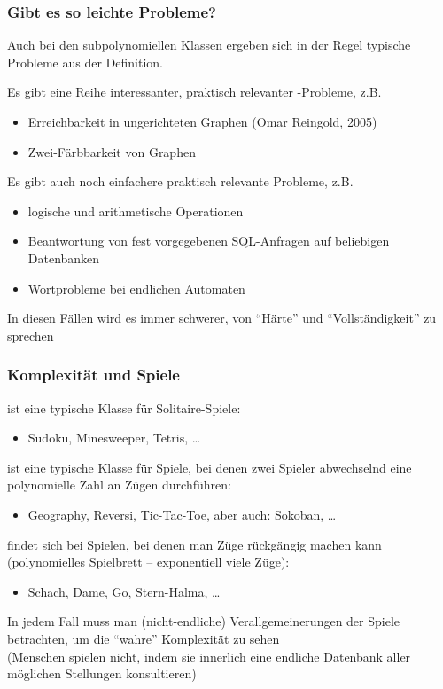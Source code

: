 \documentclass[aspectratio=1610,onlymath]{beamer}
\begin{document}
\begin{frame}\frametitle{Gibt es so leichte Probleme?}

Auch bei den subpolynomiellen Klassen ergeben sich in der Regel typische Probleme
aus der Definition.
\bigskip\pause

Es gibt eine Reihe \alert{interessanter, praktisch relevanter \LogSpace-Probleme}, z.B.
\begin{itemize}
\item Erreichbarkeit in ungerichteten Graphen (Omar Reingold, 2005)
\item Zwei-Färbbarkeit von Graphen
\end{itemize}
\bigskip\pause

Es gibt auch \alert{noch einfachere praktisch relevante Probleme}, z.B.
\begin{itemize}
\item logische und arithmetische Operationen
\item Beantwortung von fest vorgegebenen SQL-Anfragen auf beliebigen Datenbanken
\item Wortprobleme bei endlichen Automaten
\end{itemize}

In diesen Fällen wird es immer schwerer, von "`Härte"' und "`Vollständigkeit"' zu sprechen

\end{frame}

\begin{frame}\frametitle{Komplexität und Spiele}

\alert{\NP} ist eine typische Klasse für Solitaire-Spiele:
\begin{itemize}
\item Sudoku, Minesweeper, Tetris, \ldots
\end{itemize}
\bigskip\pause

\alert{\PSpace} ist eine typische Klasse für Spiele, bei denen zwei Spieler
abwechselnd eine polynomielle Zahl an Zügen durchführen:
\begin{itemize}
\item Geography, Reversi, Tic-Tac-Toe, aber auch: Sokoban, \ldots
\end{itemize}
\bigskip\pause

\alert{\ExpTime} findet sich bei Spielen, bei denen man Züge rückgängig machen kann (polynomielles Spielbrett -- exponentiell viele Züge):
\begin{itemize}
\item Schach, Dame, Go, Stern-Halma, \ldots
\end{itemize}
\smallskip

In jedem Fall muss man (nicht-endliche) Verallgemeinerungen der Spiele betrachten,
um die "`wahre"' Komplexität zu sehen\\ {\tiny(Menschen spielen nicht, indem sie
innerlich eine endliche Datenbank aller möglichen Stellungen konsultieren)}
\smallskip\pause



\end{frame}
\end{document}
